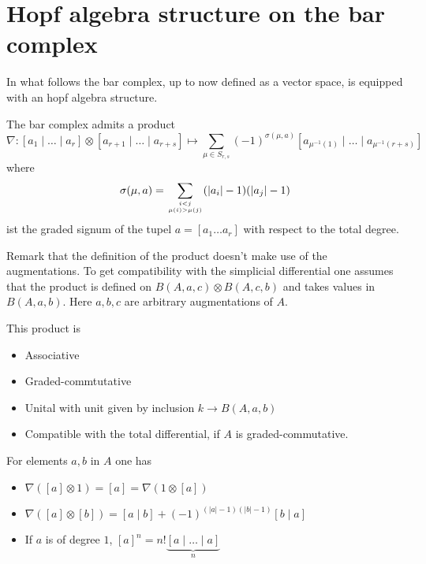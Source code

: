 \section{Hopf algebra structure on the bar complex} 
In what follows the bar complex, up to now defined as a vector space, is equipped with an hopf algebra structure. 

\begin{defn}
The bar complex admits a product
\[
\nabla : [a_1 \mid \ldots \mid a_r] \otimes [a_{r+1} \mid \ldots \mid a_{r+s}] \mapsto \sum_{\mu \in S_{r,s}} (-1)^{\sigma(\mu, a)} [a_{\mu^{-1}(1)} \mid \ldots \mid a_{\mu^{-1}(r+s)}]
\]
where
\begin{align} \label{graded_sign}
   \sigma(\mu,a) = \sum \limits_{\genfrac{}{}{0pt}{2}{i < j}{ \mu(i) > \mu(j) }} (|a_{i}|-1) (|a_{j}|-1)
\end{align}
ist the graded signum of the tupel $a=[a_1 \ldots a_r]$ with respect to the total degree. 
\end{defn}

Remark that the definition of the product doesn't make use of the augmentations. 
To get compatibility with the simplicial differential one assumes that the product is defined on $B(A,a,c) \otimes B(A,c,b)$ and takes values in $B(A,a,b)$. Here $a,b,c$ are arbitrary augmentations of $A$.


This product is 
\begin{itemize}
\item Associative
\item Graded-commtutative
\item Unital with unit given by inclusion $k \to B(A, a, b)$
\item Compatible with the total differential, if $A$ is graded-commutative.
\end{itemize}

\begin{exam} For elements $a,b$ in $A$ one has
\begin{itemize}
\item $\nabla([a] \otimes 1) = [a] = \nabla( 1 \otimes [a] )$
\item $\nabla([a] \otimes [b]) = [a \mid b] + (-1)^{(|a|-1)(|b|-1)}[b \mid a]$
\item If $a$ is of degree $1$, $[a]^n = n! \underset{n}{\underbrace{[a \mid \ldots\mid a]}}$
\end{itemize}
\end{exam} 

